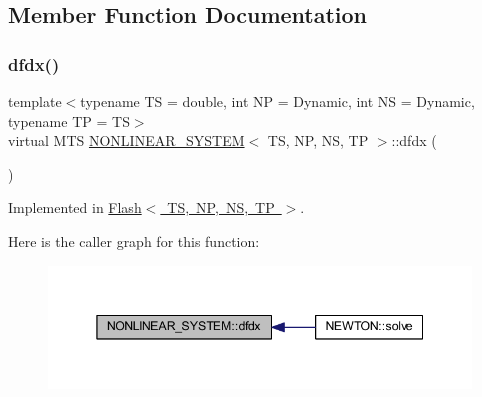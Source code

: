 \subsection{Member Function Documentation}
\mbox{\label{class_n_o_n_l_i_n_e_a_r___s_y_s_t_e_m_a531f56bcbc77f2219164af40aa16fad2}} 
\subsubsection{\texorpdfstring{dfdx()}{dfdx()}}
{\footnotesize\ttfamily template$<$typename TS = double, int NP = Dynamic, int NS = Dynamic, typename TP = TS$>$ \\
virtual M\+TS \mbox{\hyperlink{class_n_o_n_l_i_n_e_a_r___s_y_s_t_e_m}{N\+O\+N\+L\+I\+N\+E\+A\+R\+\_\+\+S\+Y\+S\+T\+EM}}$<$ TS, NP, NS, TP $>$\+::dfdx (\begin{DoxyParamCaption}{ }\end{DoxyParamCaption})\hspace{0.3cm}{\ttfamily [pure virtual]}}



Implemented in \mbox{\hyperlink{class_flash_a83e35b3ab13b3705f0fe06c40b800a8b}{Flash$<$ T\+S, N\+P, N\+S, T\+P $>$}}.

Here is the caller graph for this function\+:
\nopagebreak
\begin{figure}[H]
\begin{center}
\leavevmode
\includegraphics[width=345pt]{class_n_o_n_l_i_n_e_a_r___s_y_s_t_e_m_a531f56bcbc77f2219164af40aa16fad2_icgraph}
\end{center}
\end{figure}
\mbox{\label{class_n_o_n_l_i_n_e_a_r___s_y_s_t_e_m_a65827d7df297f26cd3f14f472a212077}} 
